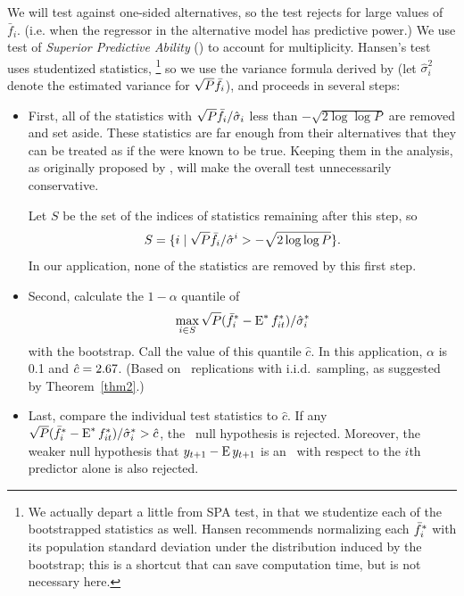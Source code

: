 \documentclass[12pt,fleqn]{article}
\begin{document}
We will test against one-sided alternatives, so the test rejects for
large values of $\bar f_i$. (i.e. when the regressor in the
alternative model has predictive power.)  We use  test
of \emph{Superior Predictive Ability} (\spa) to account for
multiplicity. Hansen's test uses studentized statistics,%
\footnote{We actually depart a little from  SPA test,
  in that we studentize each of the bootstrapped statistics as
  well. Hansen recommends normalizing each $\bar f_i^*$ with its
  population standard deviation under the distribution induced by the
  bootstrap; this is a shortcut that can save computation time, but is
  not necessary here.} %
so we use the variance formula derived by \citet{Cal:16} (let
$\hat\sigma_i^2$ denote the estimated variance for $\sqrt{P}\bar f_i$),
and proceeds in several steps:
\begin{itemize}
\item First, all of the statistics with $\sqrt{P} \bar f_i /
  \hat\sigma_i$ less than $-\sqrt{2 \log \log P}$ are removed and set
  aside. These statistics are far enough from their alternatives that
  they can be treated as if the were known to be true. Keeping them in
  the analysis, as originally proposed by \citet{Whi:00}, will make
  the overall test unnecessarily conservative.

  Let $S$ be the set of the indices of statistics remaining after this
  step, so
  \begin{equation*}
    S = \{i \mid \sqrt{P} \bar f_i / \hat\sigma^i > - \sqrt{2 \log \log P}\}.
  \end{equation*}
  In our application, none of the statistics are removed by this first
  step.
\item Second, calculate the $1 - \alpha$ quantile of
  \begin{equation*}
    \max_{i \in S} \sqrt{P} (\bar f_i^* - \operatorname{E}^* f_{it}^*) / \hat\sigma_i^*
  \end{equation*}
  with the bootstrap. Call the value of this quantile $\hat c$.  In
  this application, $\alpha$ is 0.1 and $\hat c =
  2.67$. (Based on \nboot\ replications with
  i.i.d.\ sampling, as suggested by Theorem~\ref{thm2}.)
\item Last, compare the individual test statistics to $\hat c$. If any
  $\sqrt{P} (\bar f_i^* - \operatorname{E}^* f_{it}^*) / \hat\sigma_i^* > \hat c$, the
  \mds\ null hypothesis is rejected. Moreover, the weaker null
  hypothesis that $y_{t+1} - \operatorname{E} y_{t+1}$ is an \mds\ with respect to
  the $i$th predictor alone is also rejected.
\end{itemize}
\end{document}
